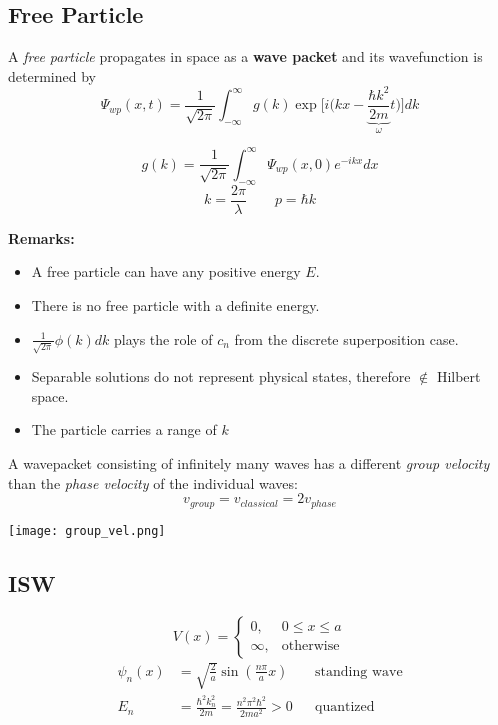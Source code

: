 \subsection{Free Particle}
A \textit{free particle} propagates in space as a \textbf{wave packet} and its wavefunction is determined by
\noindent\begin{equation*}
    \Psi_{wp}(x,t)=\frac{1}{\sqrt{2\pi}}\int_{-\infty}^{\infty}g(k)\exp\Biggl[i\Biggl(kx- \underbrace{\frac{\hbar k^{2}}{2m}}_{\omega}t\Biggr)\Biggr]dk
\end{equation*}

\noindent\begin{equation*}
    g(k)=\frac{1}{\sqrt{2\pi}}\int_{-\infty}^{\infty}\Psi_{wp}(x,0)e^{-ikx}dx
\end{equation*}
\begin{equation*}
    k  = \frac{2\pi}{\lambda}\qquad p  = \hbar k
\end{equation*}

\textbf{Remarks:}

\begin{itemize}
    \item A free particle can have any positive energy $E$.
    \item There is no free particle with a definite energy.
    \item $\frac{1}{\sqrt{2\pi}}\phi(k)dk$ plays the role of $c_n$ from the discrete superposition case.
    \item Separable solutions do not represent physical states, therefore $\notin$ Hilbert space.
    \item The particle carries a range of $k$
\end{itemize}


A wavepacket consisting of infinitely many waves has a different \textit{group velocity} than the \textit{phase velocity} of the individual waves:
\noindent\begin{equation*}
    v_{group} = v_{classical} = 2v_{phase}
\end{equation*}

\begin{center}
    \texttt{[image: group\_vel.png]}
\end{center}

\subsection{ISW}
\noindent\begin{equation*}
    V(x)=\begin{cases}0,&0\le x\le a\\\infty,&\text{otherwise}\end{cases}
\end{equation*}
\noindent\begin{align*}
    \psi_{n}(x) & =\sqrt{\frac{2}{a}}\sin\left(\frac{n\pi}{a}x\right)                      &  & \text{standing wave} \\
    E_{n}       & =\frac{\hbar^{2}k_{n}^{2}}{2m}=\frac{n^{2}\pi^{2}\hbar^{2}}{2ma^{2}} > 0 &  & \text{quantized}
\end{align*}

